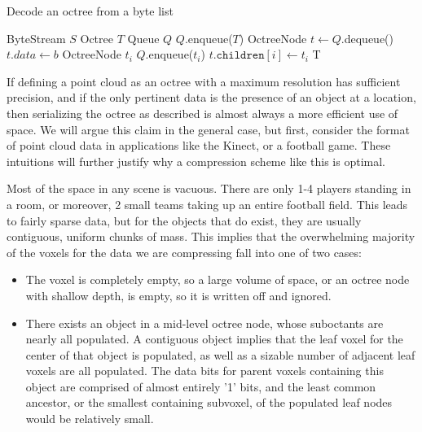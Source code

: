 \documentclass[twoside,twocolumn]{article}
\begin{document}
\begin{algorithm}[h]
\small
\caption{Decode an octree from a byte list}
\label{alg:Deserialize}
\begin{algorithmic}[1]
 {ByteStream $S$}
  \State Octree $T$
  \State Queue $Q$
  \State $Q$.enqueue($T$)
    \State OctreeNode $t \gets Q$.dequeue()
    \State $t.data \gets b$
      \State OctreeNode $t_i$
      \State $Q$.enqueue($t_i$)
      \State $t.\mathtt{children}[i] \gets t_i$
    \EndFor
  \EndFor
  \State \Return T
\EndProcedure
\Statex
\end{algorithmic}
\vspace{-0.4cm}
\end{algorithm}

If defining a point cloud as an octree with a maximum resolution has sufficient precision, and if
the only pertinent data is the presence of an object at a location, then serializing the octree
as described is almost always a more efficient use of space. We will argue this claim in the general case,
but first, consider the format of point cloud data in applications like the Kinect, or a football
game. These intuitions will further justify why a compression scheme like this is optimal.

Most of the space in any scene is vacuous. There are only 1-4 players standing in a room, or moreover,
2 small teams taking up an entire football field. This leads to fairly sparse data, but for the objects
that do exist, they are usually contiguous, uniform chunks of mass. This implies that the overwhelming
majority of the voxels for the data we are compressing fall into one of two cases:

\begin{itemize}
  \item The voxel is completely empty, so a large volume of space, or an octree node with shallow depth,
  is empty, so it is written off and ignored.
  \item There exists an object in a mid-level octree node, whose suboctants are nearly all populated.
  A contiguous object implies that the leaf voxel for the center of that object is populated, as well as
  a sizable number of adjacent leaf voxels are all populated. The data bits for parent voxels
  containing this object are comprised of almost entirely '1' bits, and the least common ancestor,
  or the smallest containing subvoxel, of the populated leaf nodes would be relatively small.
\end{itemize}
\end{document}
